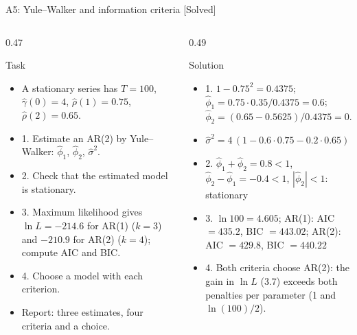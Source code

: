 \begin{frame}{A5: Yule--Walker and information criteria [Solved]}
\itemsize{\scriptsize}
\begin{columns}[T]
\begin{column}{0.47\textwidth}
\begin{block}{Task}
\begin{itemize}
    \item A stationary series has $T = 100$, $\hat\gamma(0) = 4$, $\hat\rho(1) = 0.75$, $\hat\rho(2) = 0.65$.
    \item 1. Estimate an AR(2) by Yule--Walker: $\hat\phi_1$, $\hat\phi_2$, $\hat\sigma^2$.
    \item 2. Check that the estimated model is stationary.
    \item 3. Maximum likelihood gives $\ln L = -214.6$ for AR(1) ($k = 3$) and $-210.9$ for AR(2) ($k = 4$); compute AIC and BIC.
    \item 4. Choose a model with each criterion.
    \item Report: three estimates, four criteria and a choice.
\end{itemize}
\end{block}
\end{column}
\begin{column}{0.49\textwidth}
\begin{exampleblock}{Solution}
\begin{itemize}
    \item 1. $1 - 0.75^2 = 0.4375$; $\hat\phi_1 = 0.75 \cdot 0.35/0.4375 = 0.6$; $\hat\phi_2 = (0.65 - 0.5625)/0.4375 = 0.2$
    \item $\hat\sigma^2 = 4\,(1 - 0.6 \cdot 0.75 - 0.2 \cdot 0.65) = 1.68$
    \item 2. $\hat\phi_1 + \hat\phi_2 = 0.8 < 1$, $\hat\phi_2 - \hat\phi_1 = -0.4 < 1$, $|\hat\phi_2| < 1$: stationary
    \item 3. $\ln 100 = 4.605$; AR(1): AIC $= 435.2$, BIC $= 443.02$; AR(2): AIC $= 429.8$, BIC $= 440.22$
    \item 4. Both criteria choose AR(2): the gain in $\ln L$ (3.7) exceeds both penalties per parameter (1 and $\ln(100)/2$).
\end{itemize}
\end{exampleblock}
\end{column}
\end{columns}
\end{frame}

